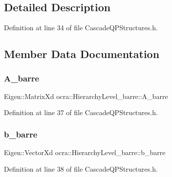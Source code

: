 \subsection{Detailed Description}


Definition at line 34 of file Cascade\+Q\+P\+Structures.\+h.



\subsection{Member Data Documentation}
\hypertarget{structocra_1_1HierarchyLevel__barre_a9e0797af20a5547e4c7b88d648e9a152}{}\label{structocra_1_1HierarchyLevel__barre_a9e0797af20a5547e4c7b88d648e9a152} 
\subsubsection{\texorpdfstring{A\+\_\+barre}{A\_barre}}
{\footnotesize\ttfamily Eigen\+::\+Matrix\+Xd ocra\+::\+Hierarchy\+Level\+\_\+barre\+::\+A\+\_\+barre}



Definition at line 37 of file Cascade\+Q\+P\+Structures.\+h.

\hypertarget{structocra_1_1HierarchyLevel__barre_a4b34116dea6da686e3b491a673adabde}{}\label{structocra_1_1HierarchyLevel__barre_a4b34116dea6da686e3b491a673adabde} 
\subsubsection{\texorpdfstring{b\+\_\+barre}{b\_barre}}
{\footnotesize\ttfamily Eigen\+::\+Vector\+Xd ocra\+::\+Hierarchy\+Level\+\_\+barre\+::b\+\_\+barre}



Definition at line 38 of file Cascade\+Q\+P\+Structures.\+h.

\hypertarget{structocra_1_1HierarchyLevel__barre_a3d60346fbdc2ff5c366b6b5f7b802af1}{}\label{structocra_1_1HierarchyLevel__barre_a3d60346fbdc2ff5c366b6b5f7b802af1} 
